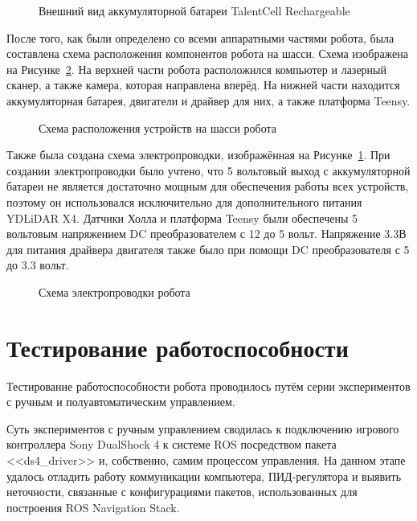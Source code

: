\begin{figure}[ht]
    \caption{Внешний вид аккумуляторной батареи TalentCell Rechargeable}\label{fig:battery}
\end{figure}

После того, как были определено со всеми аппаратными частями робота, была составлена схема расположения компонентов робота на шасси. Схема изображена на Рисунке~\cref{fig:devices}. На верхней части робота расположился компьютер и лазерный сканер, а также камера, которая направлена вперёд. На нижней части находится аккумуляторная батарея, двигатели и драйвер для них, а также платформа Teensy.

\begin{figure}[ht]
    \caption{Схема расположения устройств на шасси робота}\label{fig:devices}
\end{figure}

Также была создана схема электропроводки, изображённая на Рисунке~\cref{fig:battery}. При создании электропроводки было учтено, что 5 вольтовый выход с аккумуляторной батареи не является достаточно мощным для обеспечения работы всех устройств, поэтому он использовался исключительно для дополнительного питания YDLiDAR X4. Датчики Холла и платформа Teensy были обеспечены 5 вольтовым напряжением DC преобразователем с 12 до 5 вольт. Напряжение 3.3В для питания драйвера двигателя также было при помощи DC преобразователя с 5 до 3.3 вольт.

\begin{figure}[ht]
    \caption{Схема электропроводки робота}\label{fig:wires}
\end{figure}

\section{Тестирование работоспособности} 

Тестирование работоспособности робота проводилось путём серии экспериментов с ручным и полуавтоматическим управлением.

Суть экспериментов с ручным управлением сводилась к подключению игрового контроллера Sony DualShock 4 к системе ROS посредством пакета <<ds4\_driver>> и, собственно, самим процессом управления. На данном этапе удалось отладить работу коммуникации компьютера, ПИД-регулятора и выявить неточности, связанные с конфигурациями пакетов, использованных для построения ROS Navigation Stack.

